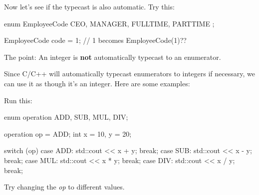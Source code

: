 Now let's see if the typecast is also automatic. Try this:

\begin{consolethree}[escapeinside=||]
enum EmployeeCode
{
    CEO, MANAGER, FULLTIME, PARTTIME
};

EmployeeCode code = 1; // 1 becomes EmployeeCode(1)??
\end{consolethree}

The point: An integer is \textbf{not} automatically typecast to
an enumerator.

Since C/C++ will automatically typecast enumerators to integers if
necessary, we can use it as though it's an integer. Here
are some examples:

Run this:

\begin{consolethree}[escapeinside=||]
enum operation {ADD, SUB, MUL, DIV};

operation op = ADD;
int x = 10, y = 20;

switch (op)
{
    case ADD: std::cout << x + y; break;
    case SUB: std::cout << x - y; break;
    case MUL: std::cout << x * y; break;
    case DIV: std::cout << x / y; break;
}
\end{consolethree}

Try changing the \textit{op} to different values.



